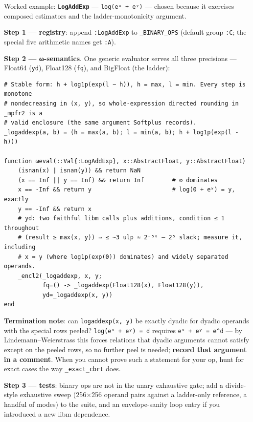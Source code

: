 \label{7660721820420346737}{}


Worked example: \textbf{\texttt{LogAddExp}} — \texttt{log(eˣ + eʸ)} — chosen because it exercises composed estimators and the ladder-monotonicity argument.



\textbf{Step 1 — registry}: append \texttt{:LogAddExp} to \texttt{\_\allowbreak{}BINARY\_\allowbreak{}OPS} (default group \texttt{:C}; the special five arithmetic names get \texttt{:A}).



\textbf{Step 2 — ω-semantics}. One generic evaluator serves all three precisions — Float64 (\texttt{yd}), Float128 (\texttt{fq}), and BigFloat (the ladder):




\nopagebreak[4]
\begin{verbatim}
# Stable form: h + log1p(exp(l − h)), h = max, l = min. Every step is monotone
# nondecreasing in (x, y), so whole-expression directed rounding in _mpfr2 is a
# valid enclosure (the same argument Softplus records).
_logaddexp(a, b) = (h = max(a, b); l = min(a, b); h + log1p(exp(l - h)))

function ωeval(::Val{:LogAddExp}, x::AbstractFloat, y::AbstractFloat)
    (isnan(x) | isnan(y)) && return NaN
    (x == Inf || y == Inf) && return Inf        # ∞ dominates
    x == -Inf && return y                       # log(0 + eʸ) = y, exactly
    y == -Inf && return x
    # yd: two faithful libm calls plus additions, condition ≤ 1 throughout
    # (result ≥ max(x, y)) ⇒ ≤ ~3 ulp ≈ 2⁻⁵⁰ — 2⁵ slack; measure it, including
    # x ≈ y (where log1p(exp(0)) dominates) and widely separated operands.
    _encl2(_logaddexp, x, y;
           fq=() -> _logaddexp(Float128(x), Float128(y)),
           yd=_logaddexp(x, y))
end
\end{verbatim}



\textbf{Termination note}: can \texttt{logaddexp(x, y)} be exactly dyadic for dyadic operands with the special rows peeled? \texttt{log(eˣ + eʸ) = d} requires \texttt{eˣ + eʸ = e{\textasciicircum}d} — by Lindemann–Weierstrass this forces relations that dyadic arguments cannot satisfy except on the peeled rows, so no further peel is needed; \textbf{record that argument in a comment}. When you cannot prove such a statement for your op, hunt for exact cases the way \texttt{\_\allowbreak{}exact\_\allowbreak{}cbrt} does.



\textbf{Step 3 — tests}: binary ops are not in the unary exhaustive gate; add a divide-style exhaustive sweep (256×256 operand pairs against a ladder-only reference, a handful of modes) to the suite, and an envelope-sanity loop entry if you introduced a new libm dependence.



